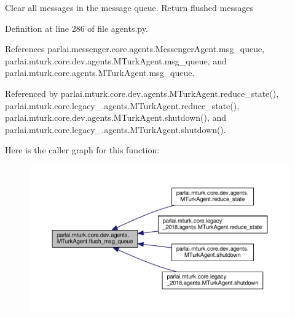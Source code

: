 \begin{DoxyVerb}Clear all messages in the message queue. Return flushed messages\end{DoxyVerb}
 

Definition at line 286 of file agents.\+py.



References parlai.\+messenger.\+core.\+agents.\+Messenger\+Agent.\+msg\+\_\+queue, parlai.\+mturk.\+core.\+dev.\+agents.\+M\+Turk\+Agent.\+msg\+\_\+queue, and parlai.\+mturk.\+core.\+agents.\+M\+Turk\+Agent.\+msg\+\_\+queue.



Referenced by parlai.\+mturk.\+core.\+dev.\+agents.\+M\+Turk\+Agent.\+reduce\+\_\+state(), parlai.\+mturk.\+core.\+legacy\+\_.\+agents.\+M\+Turk\+Agent.\+reduce\+\_\+state(), parlai.\+mturk.\+core.\+dev.\+agents.\+M\+Turk\+Agent.\+shutdown(), and parlai.\+mturk.\+core.\+legacy\+\_.\+agents.\+M\+Turk\+Agent.\+shutdown().

Here is the caller graph for this function\+:
\nopagebreak
\begin{figure}[H]
\begin{center}
\leavevmode
\includegraphics[width=350pt]{classparlai_1_1mturk_1_1core_1_1dev_1_1agents_1_1MTurkAgent_ac7a88bfcda18d7ac1862e09042cf6bd6_icgraph}
\end{center}
\end{figure}
\mbox{\label{classparlai_1_1mturk_1_1core_1_1dev_1_1agents_1_1MTurkAgent_a81c9e542c8ee09cf424c172f3fd00af2}} 

